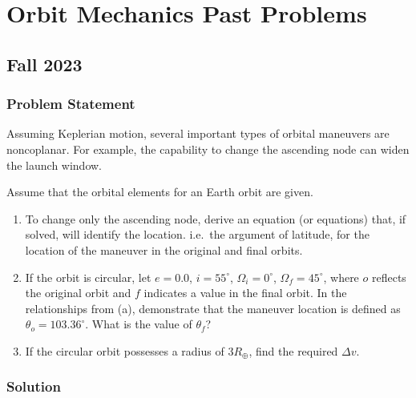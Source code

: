 \newcommand{\v}[1]{\mathbf{#1}}
\newcommand{\dv}[1]{\dot{\v{#1}}}
\newcommand{\ddv}[1]{\ddot{\v{#1}}}
\newcommand{\uv}[1]{\hat{\v{#1}}}



\maketitle

\section{Orbit Mechanics Past Problems}

\subsection{Fall 2023}

\subsubsection{Problem Statement}

Assuming Keplerian motion, several important types of orbital maneuvers are noncoplanar. For example, the capability to change the ascending node can widen the launch window.

Assume that the orbital elements for an Earth orbit are given.

\begin{enumerate}
    \item To change only the ascending node, derive an equation (or equations) that, if solved, will identify the location. i.e.\ the argument of latitude, for the location of the maneuver in the original and final orbits.
    \item If the orbit is circular, let $e=0.0$, $i=55^\circ$, $\Omega_i=0^\circ$, $\Omega_f=45^\circ$, where $o$ reflects the original orbit and $f$ indicates a value in the final orbit. In the relationships from (a), demonstrate that the maneuver location is defined as $\theta_o = 103.36^\circ$. What is the value of $\theta_f$?
    \item If the circular orbit possesses a radius of $3R_\oplus$, find the required $\Delta v$.
\end{enumerate}

\subsubsection{Solution}

